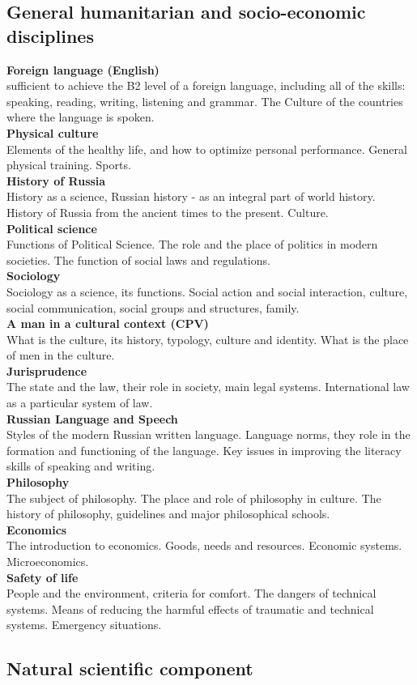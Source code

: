 \documentclass[a4paper, 12pt]{article}
\newcommand{\group}[1] {\subsection{#1}}
\newcommand{\discipline}[1] {\textbf{#1} \\ }
\newcommand{\desc}[1] { #1 \\ }
\begin{document}
\group{General humanitarian and socio-economic disciplines}


\discipline{Foreign language (English)}
\desc{sufficient to achieve the B2 level of a foreign language, including all of the skills: speaking, reading, writing, listening and grammar. The Culture of the countries where the language is spoken.}

\discipline{Physical culture}
\desc{Elements of the healthy life, and how to optimize personal performance. General physical training. Sports.}

\discipline{History of Russia}
\desc{History as a science, Russian history - as an integral part of world history. History of Russia from the ancient times to the present. Culture.}

\discipline{Political science}
\desc{Functions of Political Science. The role and the place of politics in modern societies. The function of social laws and regulations.}

\discipline{Sociology}
\desc{Sociology as a science, its functions. Social action and social interaction, culture, social communication, social groups and structures, family.}

\discipline{A man in a cultural context (CPV)}
\desc{What is the culture, its history, typology, culture and identity. What is the place of men in the culture.}

\discipline{Jurisprudence}
\desc{The state and the law, their role in society, main legal systems. International law as a particular system of law.}

\discipline{Russian Language and Speech}
\desc{Styles of the modern Russian written language. Language norms, they role in the formation and functioning of the language. Key issues in improving the literacy skills of speaking and writing.}

\discipline{Philosophy}
\desc{The subject of philosophy. The place and role of philosophy in culture. The history of philosophy, guidelines and major philosophical schools.}

\discipline{Economics}
\desc{The introduction to economics. Goods, needs and resources. Economic systems. Microeconomics.}

\discipline{Safety of life}
\desc{People and the environment, criteria for comfort. The dangers of technical systems. Means of reducing the harmful effects of traumatic and technical systems. Emergency situations.}


\group{Natural scientific component}
\end{document}
